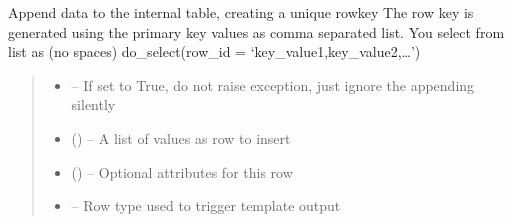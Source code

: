 \documentclass[letterpaper,10pt,english]{sphinxmanual}
\begin{document}
\begin{savenotes}
\begin{fulllineitems}
\begin{savenotes}\begin{fulllineitems}
\label{\detokenize{eezz:eezz.database.TDatabaseTable.append}}
\pysigstartsignatures
{}
\pysigstopsignatures
\sphinxAtStartPar
Append data to the internal table, creating a unique row\sphinxhyphen{}key
The row key is generated using the primary key values as comma separated list. You select from list as (no spaces)
do\_select(row\_id = ‘key\_value1,key\_value2,…’)
\begin{quote}\begin{description}
\begin{itemize}
\item {} 
\sphinxAtStartPar
{} – If set to True, do not raise exception, just ignore the appending silently

\item {} 
\sphinxAtStartPar
{} () – A list of values as row to insert

\item {} 
\sphinxAtStartPar
{} () – Optional attributes for this row

\item {} 
\sphinxAtStartPar
{} – Row type used to trigger template output


\end{itemize}
\end{description}
\end{quote}
\end{fulllineitems}
\end{savenotes}
\end{fulllineitems}
\end{savenotes}
\end{document}
